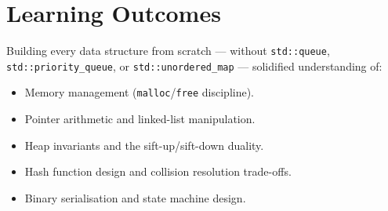 \documentclass[12pt, a4paper]{report}
\begin{document}
\section{Learning Outcomes}

Building every data structure from scratch --- without
\texttt{std::queue}, \texttt{std::priority\_queue}, or
\texttt{std::unordered\_map} --- solidified understanding of:
\begin{itemize}[nosep]
  \item Memory management (\texttt{malloc}/\texttt{free} discipline).
  \item Pointer arithmetic and linked-list manipulation.
  \item Heap invariants and the sift-up/sift-down duality.
  \item Hash function design and collision resolution trade-offs.
  \item Binary serialisation and state machine design.
\end{itemize}

\printbibliography[heading=bibintoc, title={References}]
\end{document}

